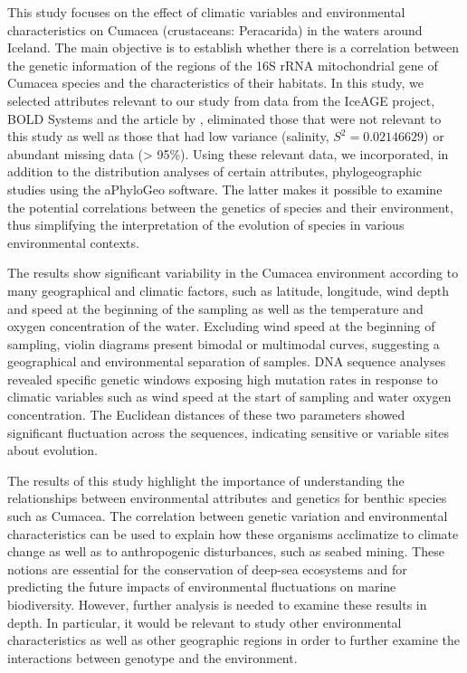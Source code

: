 This study focuses on the effect of climatic variables and environmental characteristics on Cumacea (crustaceans: Peracarida) in the waters around Iceland. The main objective is to establish whether there is a correlation between the genetic information of the regions of the 16S rRNA mitochondrial gene of Cumacea species and the characteristics of their habitats. In this study, we selected attributes relevant to our study from data from the IceAGE project, BOLD Systems and the article by \cite{uhlir_adding_2021}, eliminated those that were not relevant to this study as well as those that had low variance (salinity, $S^2 = 0.02146629$) or abundant missing data (> 95\%). Using these relevant data, we incorporated, in addition to the distribution analyses of certain attributes, phylogeographic studies using the aPhyloGeo software. The latter makes it possible to examine the potential correlations between the genetics of species and their environment, thus simplifying the interpretation of the evolution of species in various environmental contexts.

The results show significant variability in the Cumacea environment according to many geographical and climatic factors, such as latitude, longitude, wind depth and speed at the beginning of the sampling as well as the temperature and oxygen concentration of the water. Excluding wind speed at the beginning of sampling, violin diagrams present bimodal or multimodal curves, suggesting a geographical and environmental separation of samples. DNA sequence analyses revealed specific genetic windows exposing high mutation rates in response to climatic variables such as wind speed at the start of sampling and water oxygen concentration. The Euclidean distances of these two parameters showed significant fluctuation across the sequences, indicating sensitive or variable sites about evolution.

The results of this study highlight the importance of understanding the relationships between environmental attributes and genetics for benthic species such as Cumacea. The correlation between genetic variation and environmental characteristics can be used to explain how these organisms acclimatize to climate change as well as to anthropogenic disturbances, such as seabed mining. These notions are essential for the conservation of deep-sea ecosystems and for predicting the future impacts of environmental fluctuations on marine biodiversity. However, further analysis is needed to examine these results in depth. In particular, it would be relevant to study other environmental characteristics as well as other geographic regions in order to further examine the interactions between genotype and the environment.

